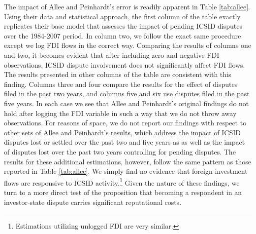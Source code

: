 \documentclass[12pt,onesided]{amsart}
\begin{document}
The impact of Allee and Peinhardt's error is readily apparent in Table \ref{tab:allee}. Using their data and statistical approach, the first column of the table exactly replicates their base model that assesses the impact of pending ICSID disputes over the 1984-2007 period. In column two, we follow the exact same procedure except we log FDI flows in the correct way. Comparing the results of columns one and two, it becomes evident that after including zero and negative FDI observations, ICSID dispute involvement does not significantly affect FDI flows. The results presented in other columns of the table are consistent with this finding. Columns three and four compare the results for the effect of disputes filed in the past two years, and columns five and six use disputes filed in the past five years. In each case we see that Allee and Peinhardt's original findings do not hold after logging the FDI variable in such a way that we do not throw away observations. For reasons of space, we do not report our findings with respect to other sets of Allee and Peinhardt's results, which address the impact of ICSID disputes lost or settled over the past two and five years as as well as the impact of disputes lost over the past two years controlling for pending disputes. The results for these additional estimations, however, follow the same pattern as those reported in Table \ref{tab:allee}. We simply find no evidence that foreign investment flows are responsive to ICSID activity.\footnote{Estimations utilizing unlogged FDI are very similar.} Given the nature of these findings, we turn to a more direct test of the proposition that becoming a respondent in an investor-state dispute carries significant reputational costs.

\end{document}
